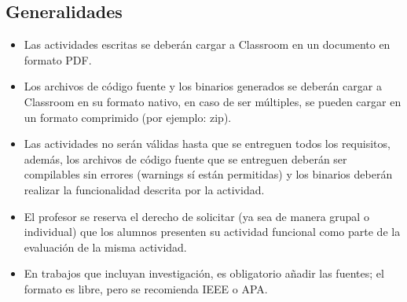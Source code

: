 \documentclass[10pt,letterpaper]{article}
\begin{document}
\subsection*{Generalidades}
\begin{itemize}
    \item Las actividades escritas se deberán cargar a Classroom en un documento en formato PDF.
    \item Los archivos de código fuente y los binarios generados se deberán cargar a Classroom en su formato nativo, en caso de ser múltiples, se pueden cargar en un formato comprimido (por ejemplo: zip).
    \item Las actividades no serán válidas hasta que se entreguen todos los requisitos, además, los archivos de código fuente que se entreguen deberán ser compilables sin errores (warnings sí están permitidas) y los binarios deberán realizar la funcionalidad descrita por la actividad. 
    \item El profesor se reserva el derecho de solicitar (ya sea de manera grupal o individual) que los alumnos presenten su actividad funcional como parte de la evaluación de la misma actividad.
    \item En trabajos que incluyan investigación, es obligatorio añadir las fuentes; el formato es libre, pero se recomienda IEEE o APA.
\end{itemize}
\end{document}
